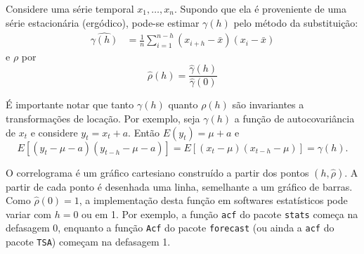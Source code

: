 \documentclass[
  letterpaper,
  DIV=11,
  numbers=noendperiod]{scrreprt}
\theoremstyle{definition}
\theoremstyle{plain}
\theoremstyle{definition}
\theoremstyle{remark}
\begin{document}
Considere uma série temporal \(x_1,\ldots,x_n\). Supondo que ela é
proveniente de uma série estacionária (ergódico), pode-se estimar
\(\gamma(h)\) pelo método da substituição: \[\begin{align}
                        \widehat{\gamma(h)}&=\frac{1}{n}\sum_{i=1}^{n-h}\left(x_{i+h} - \bar{x}\right)\left(x_{i} - \bar{x}\right)
                        \end{align}\] e \(\rho\) por\\
\[\begin{equation}
        \hat{\rho}(h)=\frac{\hat{\gamma}(h)}{\hat{\gamma}(0)}
        \end{equation}\]

É importante notar que tanto \(\gamma(h)\) quanto \(\rho(h)\) são
invariantes a transformações de locação. Por exemplo, seja \(\gamma(h)\)
a função de autocovariância de \(x_t\) e considere \(y_t=x_t+a\). Então
\(E(y_t)=\mu+a\) e
\[E[(y_t-\mu-a)(y_{t-h}-\mu-a)]=E[(x_t-\mu)(x_{t-h}-\mu)]=\gamma(h).\]

O correlograma é um gráfico cartesiano construído a partir dos pontos
\((h, \hat{\rho})\). A partir de cada ponto é desenhada uma linha,
semelhante a um gráfico de barras. Como \(\hat{\rho}(0)=1\), a
implementação desta função em softwares estatísticos pode variar com
\(h=0\) ou em 1. Por exemplo, a função \texttt{acf} do pacote
\texttt{stats} começa na defasagem 0, enquanto a função \texttt{Acf} do
pacote \texttt{forecast} (ou ainda a \texttt{acf} do pacote
\texttt{TSA}) começam na defasagem 1.
\end{document}
